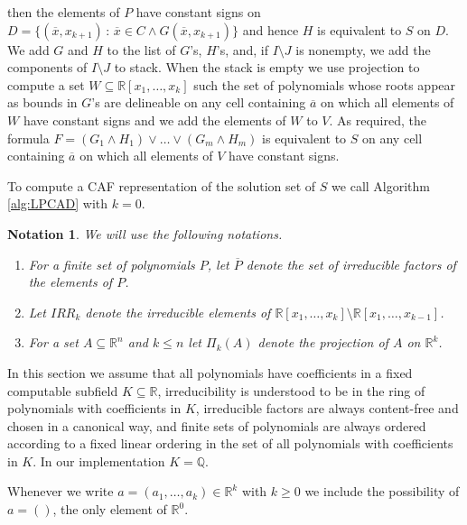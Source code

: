 \documentclass[english]{amsart}
\numberwithin{equation}{section}
\numberwithin{figure}{section}
\newtheorem{notation}[thm]{Notation}
\begin{document}
then the elements of $P$ have constant signs on $D=\{(\overline{x},x_{k+1})\,:\,\overline{x}\in C\wedge G(\overline{x},x_{k+1})\}$
and hence $H$ is equivalent to $S$ on $D$. We add $G$ and $H$
to the list of $G$'s, $H$'s, and, if $I\setminus J$ is nonempty,
we add the components of $I\setminus J$ to stack. When the stack
is empty we use projection to compute a set \emph{$W\subseteq\mathbb{R}[x_{1},\ldots,x_{k}]$}
such the set of polynomials whose roots appear as bounds in $G$'s
are delineable on any cell containing $\overline{a}$ on which all
elements of $W$ have constant signs and we add the elements of $W$
to $V$. As required, the formula $F=(G_{1}\wedge H_{1})\vee\ldots\vee(G_{m}\wedge H_{m})$
is equivalent to $S$ on any cell containing $\overline{a}$ on which
all elements of $V$ have constant signs. 

To compute a CAF representation of the solution set of $S$ we call
Algorithm \ref{alg:LPCAD} with $k=0$.
\begin{notation}
We will use the following notations.
\begin{enumerate}
\item For a finite set of polynomials $P$, let $\overline{P}$ denote the
set of irreducible factors of the elements of $P$. 
\item Let $IRR_{k}$ denote the irreducible elements of $\mathbb{R}[x_{1},\ldots,x_{k}]\setminus\mathbb{R}[x_{1},\ldots,x_{k-1}]$.
\item For a set $A\subseteq\mathbb{R}^{n}$ and $k\leq n$ let $\Pi_{k}(A)$
denote the projection of $A$ on $\mathbb{R}^{k}$.
\end{enumerate}
\end{notation}
In this section we assume that all polynomials have coefficients in
a fixed computable subfield $K\subseteq\mathbb{R}$, irreducibility
is understood to be in the ring of polynomials with coefficients in
$K$, irreducible factors are always content-free and chosen in a
canonical way, and finite sets of polynomials are always ordered according
to a fixed linear ordering in the set of all polynomials with coefficients
in $K$. In our implementation $K=\mathbb{Q}$.

Whenever we write \emph{$a=(a_{1},\ldots,a_{k})\in\mathbb{R}^{k}$}
with $k\geq0$ we include the possibility of $a=()$, the only element
of $\mathbb{R}^{0}$. 
\end{document}
